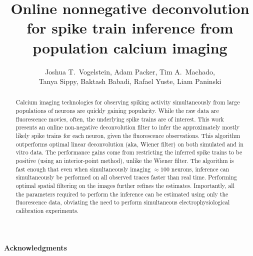  
\usepackage{multicol}
\usepackage{hyperref}
\usepackage{algorithmic}
\usepackage{algorithm}
\newcommand{\zzz}{z}
\newcommand{\az}{\argmax_{\bM \bC \geq \ve{0}}}
\newcommand{\anx}{\argmax_{n_t \in \mathbb{N}_0 \forall t}}
\newcommand{\foopsi}{fast }


\title{Online nonnegative deconvolution for spike train inference from population calcium imaging}

\author{Joshua T.~Vogelstein, Adam Packer, Tim A.~Machado, \\ Tanya Sippy, Baktash Babadi, Rafael Yuste, Liam Paninski}



\maketitle
\begin{abstract}
Calcium imaging technologies for observing spiking activity simultaneously from large populations of neurons are quickly gaining popularity.  While the raw data are fluorescence movies, often, the underlying spike trains are of interest.  This work presents an online non-negative deconvolution filter to infer the approximately mostly likely spike trains for each neuron, given the fluorescence observations.  This algorithm outperforms optimal linear deconvolution (aka, Wiener filter) on both simulated and in vitro data.  The performance gains come from restricting the inferred spike trains to be positive (using an interior-point method), unlike the Wiener filter.  The algorithm is fast enough that even when simultaneously imaging $\approx 100$ neurons, inference can simultaneously be performed on all observed traces faster than real time.  Performing optimal spatial filtering on the images further refines the estimates.  Importantly, all the parameters required to perform the inference can be estimated using only the fluorescence data, obviating the need to perform simultaneous electrophysiological calibration experiments.
\end{abstract}



\paragraph{Acknowledgments}


